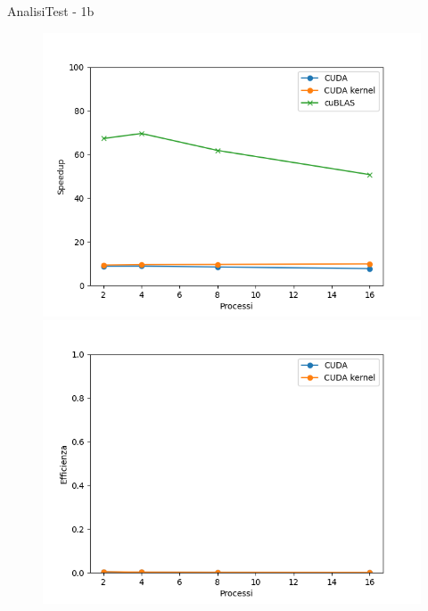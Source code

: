 \begin{frame}{Analisi}{Test - 1b}
    \begin{figure}[H]
        \centering
        \begin{minipage}{0.49\textwidth}
            \includegraphics[width=\textwidth]{./imgs/graphs/caso_a1_speedup.png}
        \end{minipage}
        \begin{minipage}{0.49\textwidth}
            \includegraphics[width=\textwidth]{./imgs/graphs/caso_a1_efficiency.png}
        \end{minipage}
    \end{figure}
\end{frame}

